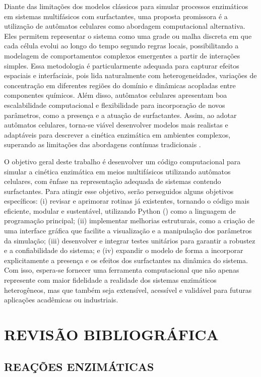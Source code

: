 \documentclass[12pt,oneside]{report}
\begin{document}
Diante das limitações dos modelos clássicos para simular processos enzimáticos em sistemas multifásicos com surfactantes, uma proposta promissora é a utilização de autômatos celulares como abordagem computacional alternativa. Eles permitem representar o sistema como uma grade ou malha discreta em que cada célula evolui ao longo do tempo segundo regras locais, possibilitando a modelagem de comportamentos complexos emergentes a partir de interações simples. Essa metodologia é particularmente adequada para capturar efeitos espaciais e interfaciais, pois lida naturalmente com heterogeneidades, variações de concentração em diferentes regiões do domínio e dinâmicas acopladas entre componentes químicos. Além disso, autômatos celulares apresentam boa escalabilidade computacional e flexibilidade para incorporação de novos parâmetros, como a presença e a atuação de surfactantes. Assim, ao adotar autômatos celulares, torna-se viável desenvolver modelos mais realistas e adaptáveis para descrever a cinética enzimática em ambientes complexos, superando as limitações das abordagens contínuas tradicionais \cite{kier2005}.

O objetivo geral deste trabalho é desenvolver um código computacional para simular a cinética enzimática em meios multifásicos utilizando autômatos celulares, com ênfase na representação adequada de sistemas contendo surfactantes. Para atingir esse objetivo, serão perseguidos alguns objetivos específicos: (i) revisar e aprimorar rotinas já existentes, tornando o código mais eficiente, modular e sustentável, utilizando Python () como a linguagem de programação principal; (ii) implementar melhorias estruturais, como a criação de uma interface gráfica que facilite a visualização e a manipulação dos parâmetros da simulação; (iii) desenvolver e integrar testes unitários para garantir a robustez e a confiabilidade do sistema; e (iv) expandir o modelo de forma a incorporar explicitamente a presença e os efeitos dos surfactantes na dinâmica do sistema. Com isso, espera-se fornecer uma ferramenta computacional que não apenas represente com maior fidelidade a realidade dos sistemas enzimáticos heterogêneos, mas que também seja extensível, acessível e validável para futuras aplicações acadêmicas ou industriais.

\chapter{REVISÃO BIBLIOGRÁFICA}
\section{REAÇÕES ENZIMÁTICAS}
\end{document}
